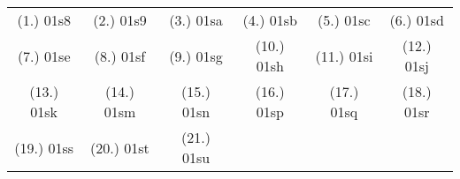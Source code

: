 \begin{eocexercises}{}
\par \practiceinfo
\par \begin{tabular}[h]{cccccc}
(1.)	01s8	&
(2.)	01s9	&
(3.)	01sa	&
(4.)	01sb	&
(5.)	01sc	&
(6.)	01sd	\\ %
(7.)	01se	&
(8.)	01sf	&
(9.)	01sg	&
(10.)	01sh	&
(11.)	01si	&
(12.)	01sj	\\ %
(13.)	01sk	&
(14.)	01sm	&
(15.)	01sn	&
(16.)	01sp	&
(17.)	01sq	&
(18.)	01sr	\\ %
(19.)	01ss	&
(20.)	01st	&
(21.)	01su	&
\end{tabular}
\end{eocexercises}




